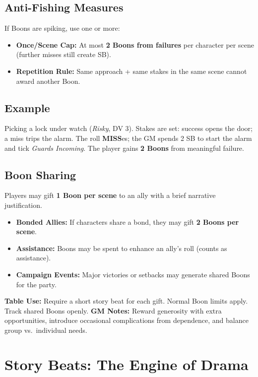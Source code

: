 \subsection{Anti-Fishing Measures}
If Boons are spiking, use one or more:
\begin{itemize}
  \item \textbf{Once/Scene Cap:} At most \textbf{2 Boons from failures} per character per scene (further misses still create SB).
  \item \textbf{Repetition Rule:} Same approach + same stakes in the same scene cannot award another Boon.
\end{itemize}

\subsection{Example}
Picking a lock under watch (\emph{Risky}, DV 3). Stakes are set: success opens the door; a miss trips the alarm. The roll \textbf{MISS}es; the GM spends 2 SB to start the alarm and tick \emph{Guards Incoming}. The player gains \textbf{2 Boons} from meaningful failure.

\subsection{Boon Sharing}

Players may gift \textbf{1 Boon per scene} to an ally with a brief narrative justification.  
\begin{itemize}
  \item \textbf{Bonded Allies:} If characters share a bond, they may gift \textbf{2 Boons per scene}.  
  \item \textbf{Assistance:} Boons may be spent to enhance an ally’s roll (counts as assistance).  
  \item \textbf{Campaign Events:} Major victories or setbacks may generate shared Boons for the party.  
\end{itemize}

\textbf{Table Use:} Require a short story beat for each gift. Normal Boon limits apply. Track shared Boons openly.  
\textbf{GM Notes:} Reward generosity with extra opportunities, introduce occasional complications from dependence, and balance group vs.\ individual needs.

\section{Story Beats: The Engine of Drama}

